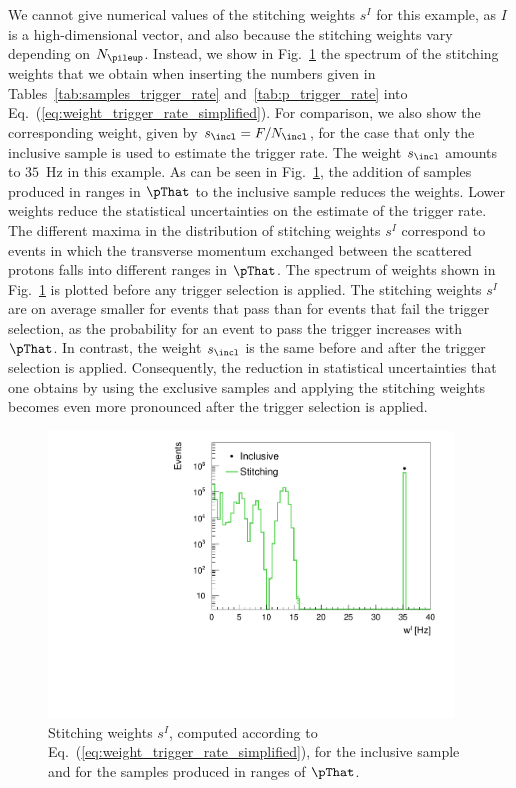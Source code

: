 We cannot give numerical values of the stitching weights $s^{I}$ for this example,
as $I$ is a high-dimensional vector, and also because the stitching weights vary depending on $N_{\pileup}$.
Instead, we show in Fig.~\ref{fig:weight_trigger_rate} the spectrum of the stitching weights
that we obtain when inserting the numbers given in Tables~\ref{tab:samples_trigger_rate} and~\ref{tab:p_trigger_rate} into Eq.~(\ref{eq:weight_trigger_rate_simplified}).
For comparison, we also show the corresponding weight, given by $s_{\incl} = F/N_{\incl}$,
for the case that only the inclusive sample is used to estimate the trigger rate.
The weight $s_{\incl}$ amounts to $35$~Hz in this example.
As can be seen in Fig.~\ref{fig:weight_trigger_rate}, the addition of samples produced in ranges in $\pThat$ to the inclusive sample reduces the weights.
Lower weights reduce the statistical uncertainties on the estimate of the trigger rate.
The different maxima in the distribution of stitching weights $s^{I}$ correspond to events 
in which the transverse momentum exchanged between the scattered protons falls into different ranges in $\pThat$.
The spectrum of weights shown in Fig.~\ref{fig:weight_trigger_rate} is plotted before any trigger selection is applied.
The stitching weights $s^{I}$ are on average smaller for events that pass than for events that fail the trigger selection,
as the probability for an event to pass the trigger increases with $\pThat$.
In contrast, the weight $s_{\incl}$ is the same before and after the trigger selection is applied.
Consequently, the reduction in statistical uncertainties that one obtains by using the exclusive samples and applying the stitching weights 
becomes even more pronounced after the trigger selection is applied.

\begin{figure}
\setlength{\unitlength}{1mm}
\begin{center}
\includegraphics*[height=76mm]{plots/makeEvtWeightPlotsForPaper_evtWeight_log.pdf}
\end{center}
\caption{
  Stitching weights $s^{I}$, computed according to Eq.~(\ref{eq:weight_trigger_rate_simplified}), 
  for the inclusive sample and for the samples produced in ranges of $\pThat$.
}
\label{fig:weight_trigger_rate}
\end{figure}

